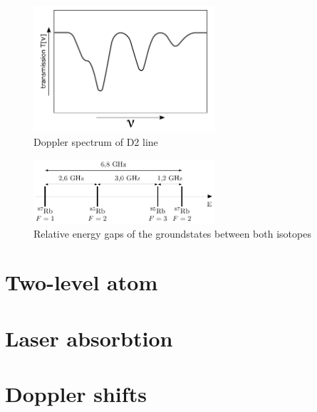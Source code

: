 \vspace{\fill}

\begin{figure}[h]
\centering
\includegraphics[width=0.6\textwidth]{spectrum_doppler}
\caption{Doppler spectrum of D2 line}
\label{fig:doppler} 
\end{figure}

\vspace{\fill}
\pagebreak

\begin{figure}[h]
\centering
\includegraphics[width=0.6\textwidth]{groundstate}
\caption{Relative energy gaps of the groundstates between both isotopes}
\label{fig:gap} 
\end{figure}



\section{Two-level atom} %


\pagebreak
\section{Laser absorbtion}  %

\pagebreak
\section{Doppler shifts}  %

